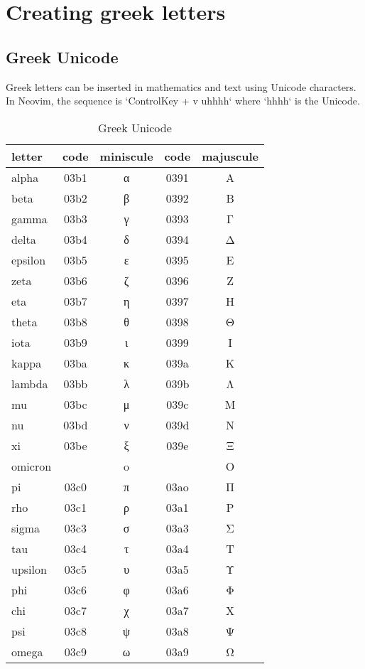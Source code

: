 \documentclass[10pt, letterpaper, twoside]{article}
\begin{document}
\newpage
\section{Creating greek letters}\label{sec:greek_letters}

\subsection{Greek Unicode}\label{sec:greek_unicode}

Greek letters can be inserted in mathematics and text using Unicode characters. In Neovim, the sequence is `ControlKey + v uhhhh` where `hhhh` is the Unicode.

\begin{table}[H]
\begin{flushleft}
\begin{tabular}{lcccc}
\toprule
letter & code & miniscule & code & majuscule \\
\midrule
alpha   & 03b1 & α & 0391 & Α \\
beta    & 03b2 & β & 0392 & Β \\
gamma   & 03b3 & γ & 0393 & Γ \\
delta   & 03b4 & δ & 0394 & Δ \\
epsilon & 03b5 & ε & 0395 & Ε \\
zeta    & 03b6 & ζ & 0396 & Ζ \\
eta     & 03b7 & η & 0397 & Η \\
theta   & 03b8 & θ & 0398 & Θ \\
iota    & 03b9 & ι & 0399 & Ι \\
kappa   & 03ba & κ & 039a & Κ \\
lambda  & 03bb & λ & 039b & Λ \\
mu      & 03bc & μ & 039c & Μ \\
nu      & 03bd & ν & 039d & Ν \\
xi      & 03be & ξ & 039e & Ξ \\
omicron &      & o &      & O \\
pi      & 03c0 & π & 03ao & Π \\
rho     & 03c1 & ρ & 03a1 & Ρ \\
sigma   & 03c3 & σ & 03a3 & Σ \\
tau     & 03c4 & τ & 03a4 & Τ \\
upsilon & 03c5 & υ & 03a5 & Υ \\
phi     & 03c6 & φ & 03a6 & Φ \\
chi     & 03c7 & χ & 03a7 & Χ \\
psi     & 03c8 & ψ & 03a8 & Ψ \\
omega   & 03c9 & ω & 03a9 & Ω \\
\bottomrule
\end{tabular}
\label{tab:greek_unicode}
\caption{Greek Unicode}
\end{flushleft}
\end{table}
\end{document}
